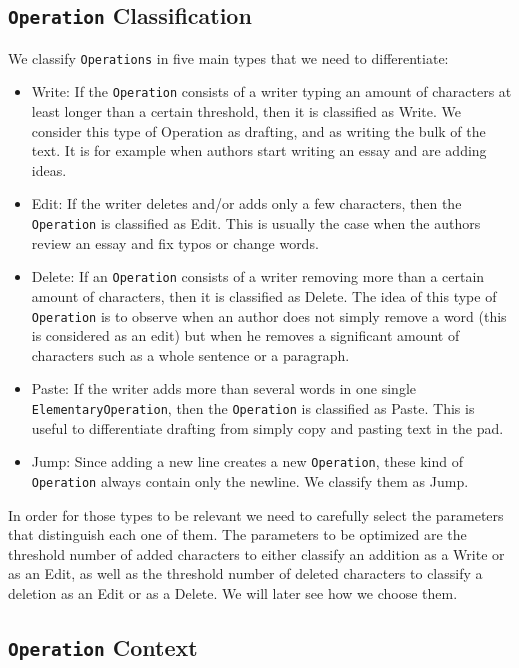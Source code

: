 \documentclass[a4, twocolumn, 12pt]{article}
\begin{document}
\subsection{\texttt{Operation} Classification}
We classify \texttt{Operations} in five main types that we need to differentiate:
\begin{itemize}
    \item Write: If the \texttt{Operation} consists of a writer typing an amount of characters at least longer than a certain threshold, then it is classified as Write. We consider this type of Operation as drafting, and as writing the bulk of the text. It is for example when authors start writing an essay and are adding ideas.
    
    \item Edit: If the writer deletes and/or adds only a few characters, then the \texttt{Operation} is classified as Edit. This is usually the case when the authors review an essay and fix typos or change words.
    
    \item Delete: If an \texttt{Operation} consists of a writer removing more than a certain amount of characters, then it is classified as Delete. The idea of this type of \texttt{Operation} is to observe when an author does not simply remove a word (this is considered as an edit) but when he removes a significant amount of characters such as a whole sentence or a paragraph.
    
    \item Paste: If the writer adds more than several words in one single \texttt{ElementaryOperation}, then the \texttt{Operation} is classified as Paste. This is useful to differentiate drafting from simply copy and pasting text in the pad. 
    
    \item Jump: Since adding a new line creates a new \texttt{Operation}, these kind of \texttt{Operation} always contain only the newline. We classify them as Jump. 
\end{itemize}

In order for those types to be relevant we need to carefully select the parameters that distinguish each one of them. The parameters to be optimized are the threshold number of added characters to either classify an addition as a Write or as an Edit, as well as the threshold number of deleted characters to classify a deletion as an Edit or as a Delete. We will later see how we choose them.

\subsection{\texttt{Operation} Context}
\end{document}
